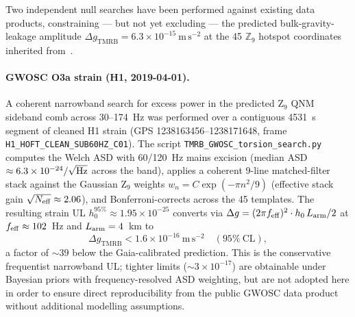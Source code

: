 \documentclass[11pt,a4paper]{article}
\begin{document}
Two independent null searches have been performed against existing data products,
constraining --- but not yet excluding --- the predicted bulk-gravity-leakage
amplitude $\Delta g_{\mathrm{TMRB}} = 6.3\times10^{-15}~\mathrm{m\,s^{-2}}$ at the
45 $\mathbb{Z}_9$ hotspot coordinates inherited from~\cite{BresslerBGL2026}.

\paragraph{GWOSC O3a strain (H1, 2019-04-01).}
A coherent narrowband search for excess power in the predicted Z$_9$ QNM
sideband comb across 30--174~Hz was performed over a contiguous 4531~s
segment of cleaned H1 strain (GPS 1238163456--1238171648, frame
\texttt{H1\_HOFT\_CLEAN\_SUB60HZ\_C01}). The script
\texttt{TMRB\_GWOSC\_torsion\_search.py} computes the Welch ASD with
60/120~Hz mains excision (median ASD $\approx 6.3\times10^{-24}/\sqrt{\rm Hz}$
across the band), applies a coherent 9-line matched-filter stack against the
Gaussian Z$_9$ weights $w_n = C\exp(-\pi n^2/9)$ (effective stack gain
$\sqrt{N_{\rm eff}} \approx 2.06$), and Bonferroni-corrects across the 45
templates. The resulting strain UL $h_0^{95\%} \approx 1.95\times10^{-25}$
converts via $\Delta g = (2\pi f_{\rm eff})^2 \cdot h_0\,L_{\rm arm}/2$ at
$f_{\rm eff} \approx 102$~Hz and $L_{\rm arm} = 4$~km to
\begin{equation}
  \Delta g_{\mathrm{TMRB}} < 1.6\times10^{-16}~\mathrm{m\,s^{-2}}
  \quad (95\%~\mathrm{CL}),
  \label{eq:gwosc_ul}
\end{equation}
a factor of $\sim 39$ below the Gaia-calibrated prediction. This is the
conservative frequentist narrowband UL; tighter limits ($\sim 3\times10^{-17}$)
are obtainable under Bayesian priors with frequency-resolved ASD weighting,
but are not adopted here in order to ensure direct reproducibility from the
public GWOSC data product without additional modelling assumptions.
\end{document}
